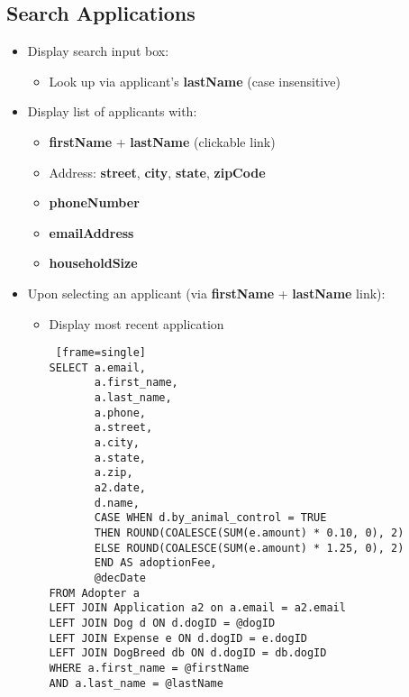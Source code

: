 \documentclass{article}
\begin{document}
\subsection{Search Applications}
\begin{itemize}
    \item Display search input box:
    \begin{itemize}
        \item Look up via applicant's 	\textbf{lastName} (case insensitive)
    \end{itemize}
    \item Display list of applicants with:
    \begin{itemize}
    \begin{Verbatim} [frame=single]
SELECT ad.first_name, 
       ad.last_name, 
       ad.street, 
       ad.city, 
       ad.state, 
       ad.zip AS zip_code, 
       ad.phone AS phone_number, 
       ad.email AS email_address, 
       ad.household 
FROM Adopter ad 
WHERE ad.last_name LIKE '%@lastName%';
        \end{Verbatim}
        \item 	\textbf{firstName} + 	\textbf{lastName} (clickable link)
        \item Address: 	\textbf{street}, 	\textbf{city}, 	\textbf{state}, 	\textbf{zipCode}
        \item 	\textbf{phoneNumber}
        \item 	\textbf{emailAddress}
        \item 	\textbf{householdSize}
    \end{itemize}
    \item Upon selecting an applicant (via 	\textbf{firstName} + 	\textbf{lastName} link):
    \begin{itemize}
        \item Display most recent application
        \begin{Verbatim} [frame=single]
SELECT a.email, 
       a.first_name, 
       a.last_name, 
       a.phone, 
       a.street, 
       a.city, 
       a.state, 
       a.zip,
       a2.date,
       d.name,
       CASE WHEN d.by_animal_control = TRUE 
       THEN ROUND(COALESCE(SUM(e.amount) * 0.10, 0), 2) 
       ELSE ROUND(COALESCE(SUM(e.amount) * 1.25, 0), 2) 
       END AS adoptionFee,
       @decDate
FROM Adopter a
LEFT JOIN Application a2 on a.email = a2.email
LEFT JOIN Dog d ON d.dogID = @dogID
LEFT JOIN Expense e ON d.dogID = e.dogID 
LEFT JOIN DogBreed db ON d.dogID = db.dogID
WHERE a.first_name = @firstName 
AND a.last_name = @lastName

\end{Verbatim}
\end{itemize}
\end{itemize}
\end{document}
